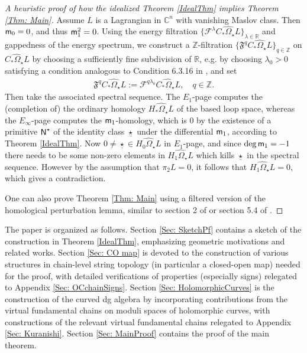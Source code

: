 \documentclass[10pt]{amsart}
\numberwithin{equation}{section}
\theoremstyle{plain}
\theoremstyle{definition}
\theoremstyle{remark}
\numberwithin{equation}{section}
\newcommand{\R}{\mathbb{R}}
\newcommand{\Z}{\mathbb{Z}}
\newcommand{\C}{\mathbb{C}}
\newcommand{\wh}[1]{\widehat{#1}}
\newcommand{\mf}[1]{\mathfrak{#1}}
\newcommand{\ms}[1]{\mathscr{#1}}
\newcommand{\mm}{\textup{\textsf{m}}}
\newcommand{\NN}{\textup{\textsf{N}}}
\begin{document}
\begin{proof}
	[A heuristic proof of how the idealized Theorem \ref{IdealThm} implies Theorem \ref{Thm: Main}]
	Assume $L$ is a Lagrangian in $\C^n$ with vanishing Maslov class. Then $\mm_0=0$, and thus $\mm_1^2=0$.
	Using the energy filtration $\{\ms{F}^\lambda \wh{C_*\Omega_\star L}\}_{\lambda\in \R}$ and gappedness of the energy spectrum, we construct a $\Z$-filtration $\{\mf{F}^q \wh{C_*\Omega_\star L}\}_{q\in \Z}$ on $\wh{C_*\Omega_\star L}$ by choosing a sufficiently fine subdivision of $\R$, e.g. by choosing $\lambda_0>0$ satisfying a condition analogous to Condition 6.3.16 in \cite{FOOO1}, and set
	\begin{align*}
		\mf{F}^q\wh{C_*\Omega_\star L}:= \ms{F}^{q\lambda_0} \wh{C_*\Omega_\star L},\quad q\in\Z.
	\end{align*} 
	Then take the associated spectral sequence. The $E_1$-page computes the (completion of) the ordinary homology $\wh{H_*\Omega_\star L}$ of the based loop space, whereas the $E_\infty$-page computes the $\mm_1$-homology, which is 0 by the existence of a primitive $\NN^\star$ of the identity class $\underline{\star}$ under the differential $\mm_1$, according to Theorem \ref{IdealThm}.
	Now $0\neq \underline{\star}\in \wh{H_0\Omega_\star L}$ in $E_1$-page, and since $\deg  \mm_1 = -1$ there needs to be some non-zero elements in $\wh{H_1\Omega_\star L}$ which kills $\underline{\star}$ in the spectral sequence. 
	However by the assumption that $\pi_2 L=0$, it follows that $\wh{H_1\Omega_\star L}=0$, which gives a contradiction.
	
	
	One can also prove Theorem \ref{Thm: Main} using a filtered version of the homological perturbation lemma, similar to section 2 of \cite{Irie2} or section 5.4 of \cite{FOOO1}.
\end{proof}


\bigskip
The paper is organized as follows.
Section \ref{Sec: SketchPf} contains a sketch of the construction in Theorem \ref{IdealThm}, emphasizing  geometric motivations and related works.
Section \ref{Sec: CO map} is devoted to the construction of various structures in chain-level string topology  (in particular a closed-open map) needed for the proof, with detailed verifications of properties (especially signs) relegated to Appendix \ref{Sec: OCchainSigns}.
Section \ref{Sec: HolomorphicCurves} is the construction of the curved dg algebra by incorporating contributions from the virtual fundamental chains on moduli spaces of holomorphic curves, with constructions of the relevant virtual fundamental chains relegated to Appendix \ref{Sec: Kuranishi}. 
Section \ref{Sec: MainProof} contains the proof of the main theorem.
\end{document}
